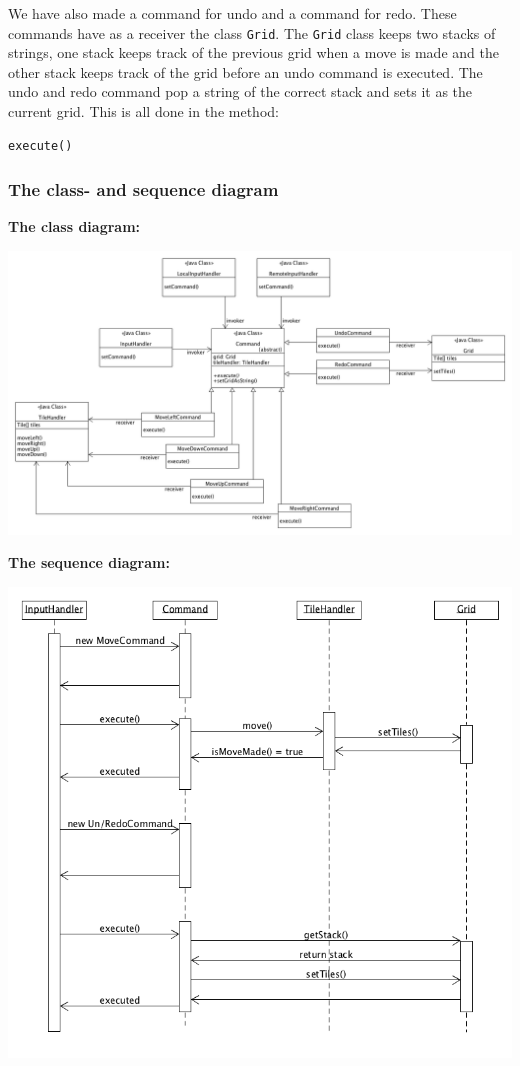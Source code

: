 \documentclass[a4paper,11pt,report]{scrartcl}
\begin{document}
We have also made a command for undo and a command for redo. These commands have as a receiver the class \texttt{Grid}. The \texttt{Grid} class keeps two stacks of strings, one stack keeps track of the previous grid when a move is made and the other stack keeps track of the grid before an undo command is executed. The undo and redo command pop a string of the correct stack and sets it as the current grid. This is all done in the method:
\begin{verbatim}
execute()
\end{verbatim}


\newpage
\subsubsection{The class- and sequence diagram}
\textbf{The class diagram:}\\
\centerline{\includegraphics[scale=0.4]{commandPatternUML}}

\newpage\textbf{The sequence diagram:}\\
\centerline{\includegraphics[scale=0.5]{commandPatternSequence}}
\end{document}
